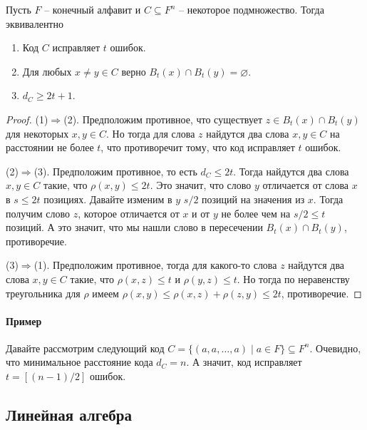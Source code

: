 \begin{claim}
\label{claim::CodeCorrectsTMist}
Пусть $F$ -- конечный алфавит и $C\subseteq F^n$ -- некоторое подмножество.
Тогда эквивалентно
\begin{enumerate}
\item Код $C$ исправляет $t$ ошибок.

\item Для любых $x\neq y\in C$ верно $B_t(x)\cap B_t(y) = \varnothing$.

\item $d_C \geqslant 2t + 1$.
\end{enumerate}
\end{claim}
\begin{proof}
(1)$\Rightarrow$(2).
Предположим противное, что существует $z\in B_t(x) \cap B_t(y)$ для некоторых $x,y\in C$.
Но тогда для слова $z$ найдутся два слова $x,y\in C$ на расстоянии не более $t$, что противоречит тому, что код исправляет $t$ ошибок.

(2)$\Rightarrow$(3).
Предположим противное, то есть $d_C \leqslant 2t$.
Тогда найдутся два слова $x,y\in C$ такие, что $\rho(x, y) \leqslant 2t$.
Это значит, что слово $y$ отличается от слова $x$ в $s\leqslant 2t$ позициях.
 Давайте изменим в $y$ $s/2$ позиций на значения из $x$.
Тогда получим слово $z$, которое отличается от $x$ и от $y$ не более чем на $s/2 \leqslant t$ позиций.
 А это значит, что мы нашли слово в пересечении $B_t(x) \cap B_t(y)$, противоречие.

(3)$\Rightarrow$(1).
Предположим противное, тогда для какого-то слова $z$ найдутся два слова $x,y\in C$ такие, что $\rho(x,z) \leqslant t$ и $\rho(y,z) \leqslant t$.
Но тогда по неравенству треугольника для $\rho$ имеем $\rho(x,y) \leqslant \rho(x,z)+ \rho (z,y) \leqslant 2t$, противоречие.
\end{proof}

\paragraph{Пример}

Давайте рассмотрим следующий код $C = \{(a, a, \ldots, a)\mid a\in F\}\subseteq F^n$.
Очевидно, что минимальное расстояние кода $d_C = n$.
А значит, код исправляет $t = [(n-1)/2]$ ошибок.

\subsection{Линейная алгебра}

